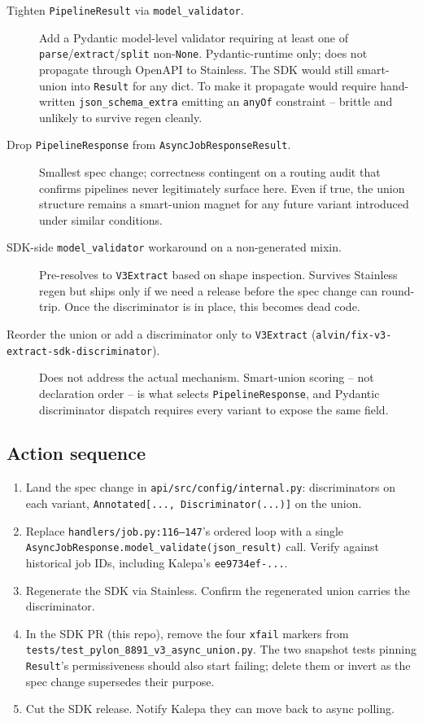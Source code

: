 \documentclass[11pt]{article}
\begin{document}
\begin{description}
  \item[Tighten \texttt{PipelineResult} via \texttt{model\_validator}.] Add a Pydantic model-level validator requiring at least one of \texttt{parse}/\texttt{extract}/\texttt{split} non-\texttt{None}. Pydantic-runtime only; does not propagate through OpenAPI to Stainless. The SDK would still smart-union into \texttt{Result} for any dict. To make it propagate would require hand-written \texttt{json\_schema\_extra} emitting an \texttt{anyOf} constraint -- brittle and unlikely to survive regen cleanly.

  \item[Drop \texttt{PipelineResponse} from \texttt{AsyncJobResponseResult}.] Smallest spec change; correctness contingent on a routing audit that confirms pipelines never legitimately surface here. Even if true, the union structure remains a smart-union magnet for any future variant introduced under similar conditions.

  \item[SDK-side \texttt{model\_validator} workaround on a non-generated mixin.] Pre-resolves to \texttt{V3Extract} based on shape inspection. Survives Stainless regen but ships only if we need a release before the spec change can round-trip. Once the discriminator is in place, this becomes dead code.

  \item[Reorder the union or add a discriminator only to \texttt{V3Extract} (\texttt{alvin/fix-v3-extract-sdk-discriminator}).] Does not address the actual mechanism. Smart-union scoring -- not declaration order -- is what selects \texttt{PipelineResponse}, and Pydantic discriminator dispatch requires every variant to expose the same field.
\end{description}

\subsection{Action sequence}

\begin{enumerate}
  \item Land the spec change in \texttt{api/src/config/internal.py}: discriminators on each variant, \texttt{Annotated[..., Discriminator(...)]} on the union.
  \item Replace \texttt{handlers/job.py:116--147}'s ordered loop with a single \texttt{AsyncJobResponse.model\_validate(json\_result)} call. Verify against historical job IDs, including Kalepa's \texttt{ee9734ef-...}.
  \item Regenerate the SDK via Stainless. Confirm the regenerated union carries the discriminator.
  \item In the SDK PR (this repo), remove the four \texttt{xfail} markers from \texttt{tests/test\_pylon\_8891\_v3\_async\_union.py}. The two snapshot tests pinning \texttt{Result}'s permissiveness should also start failing; delete them or invert as the spec change supersedes their purpose.
  \item Cut the SDK release. Notify Kalepa they can move back to async polling.
\end{enumerate}
\end{document}
